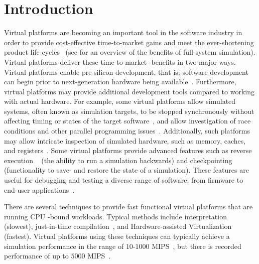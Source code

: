 
\section{Introduction}
\label{sec:introduction}
Virtual platforms are becoming an important tool in the software industry in order to provide cost-effective time-to-market gains and meet the ever-shortening product life-cycles~ (see  for an overview of the benefits of full-system simulation).
Virtual platforms deliver these time-to-market -benefits in two major ways.
Virtual platforms enable pre-silicon development, that is; software development can begin prior to next-generation hardware being available~.
Furthermore, virtual platforms may provide additional development tools compared to working with actual hardware.
For example, some virtual platforms allow simulated systems, often known as simulation targets, to be stopped synchronously without affecting timing or states of the target software~, and allow investigation of race conditions and other parallel programming issues~.
Additionally, such platforms may allow intricate inspection of simulated hardware, such as memory, caches, and registers~.
Some virtual platforms provide advanced features such as reverse execution ~ (the ability to run a simulation backwards) and checkpointing ~ (functionality to save- and restore the state of a simulation).
These features are useful for debugging and testing a diverse range of software; from firmware to end-user applications~.

There are several techniques to provide fast functional virtual platforms that are running CPU -bound workloads.
Typical methods include interpretation ~ (slowest), just-in-time compilation~, and Hardware-assisted Virtualization ~ (fastest).
Virtual platforms using these techniques can typically achieve a simulation performance in the range of $10$-$1000$ MIPS~, but there is recorded performance of up to $5000$ MIPS~.

